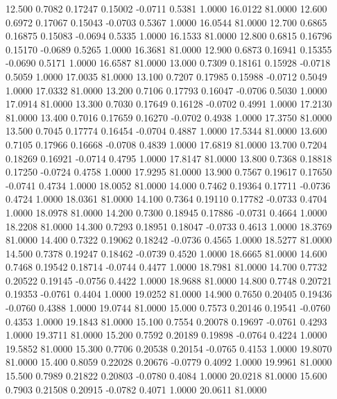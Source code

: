   12.500   0.7082   0.17247   0.15002  -0.0711   0.5381   1.0000  16.0122  81.0000
  12.600   0.6972   0.17067   0.15043  -0.0703   0.5367   1.0000  16.0544  81.0000
  12.700   0.6865   0.16875   0.15083  -0.0694   0.5335   1.0000  16.1533  81.0000
  12.800   0.6815   0.16796   0.15170  -0.0689   0.5265   1.0000  16.3681  81.0000
  12.900   0.6873   0.16941   0.15355  -0.0690   0.5171   1.0000  16.6587  81.0000
  13.000   0.7309   0.18161   0.15928  -0.0718   0.5059   1.0000  17.0035  81.0000
  13.100   0.7207   0.17985   0.15988  -0.0712   0.5049   1.0000  17.0332  81.0000
  13.200   0.7106   0.17793   0.16047  -0.0706   0.5030   1.0000  17.0914  81.0000
  13.300   0.7030   0.17649   0.16128  -0.0702   0.4991   1.0000  17.2130  81.0000
  13.400   0.7016   0.17659   0.16270  -0.0702   0.4938   1.0000  17.3750  81.0000
  13.500   0.7045   0.17774   0.16454  -0.0704   0.4887   1.0000  17.5344  81.0000
  13.600   0.7105   0.17966   0.16668  -0.0708   0.4839   1.0000  17.6819  81.0000
  13.700   0.7204   0.18269   0.16921  -0.0714   0.4795   1.0000  17.8147  81.0000
  13.800   0.7368   0.18818   0.17250  -0.0724   0.4758   1.0000  17.9295  81.0000
  13.900   0.7567   0.19617   0.17650  -0.0741   0.4734   1.0000  18.0052  81.0000
  14.000   0.7462   0.19364   0.17711  -0.0736   0.4724   1.0000  18.0361  81.0000
  14.100   0.7364   0.19110   0.17782  -0.0733   0.4704   1.0000  18.0978  81.0000
  14.200   0.7300   0.18945   0.17886  -0.0731   0.4664   1.0000  18.2208  81.0000
  14.300   0.7293   0.18951   0.18047  -0.0733   0.4613   1.0000  18.3769  81.0000
  14.400   0.7322   0.19062   0.18242  -0.0736   0.4565   1.0000  18.5277  81.0000
  14.500   0.7378   0.19247   0.18462  -0.0739   0.4520   1.0000  18.6665  81.0000
  14.600   0.7468   0.19542   0.18714  -0.0744   0.4477   1.0000  18.7981  81.0000
  14.700   0.7732   0.20522   0.19145  -0.0756   0.4422   1.0000  18.9688  81.0000
  14.800   0.7748   0.20721   0.19353  -0.0761   0.4404   1.0000  19.0252  81.0000
  14.900   0.7650   0.20405   0.19436  -0.0760   0.4388   1.0000  19.0744  81.0000
  15.000   0.7573   0.20146   0.19541  -0.0760   0.4353   1.0000  19.1843  81.0000
  15.100   0.7554   0.20078   0.19697  -0.0761   0.4293   1.0000  19.3711  81.0000
  15.200   0.7592   0.20189   0.19898  -0.0764   0.4224   1.0000  19.5852  81.0000
  15.300   0.7706   0.20538   0.20154  -0.0765   0.4153   1.0000  19.8070  81.0000
  15.400   0.8059   0.22028   0.20676  -0.0779   0.4092   1.0000  19.9961  81.0000
  15.500   0.7989   0.21822   0.20803  -0.0780   0.4084   1.0000  20.0218  81.0000
  15.600   0.7903   0.21508   0.20915  -0.0782   0.4071   1.0000  20.0611  81.0000
